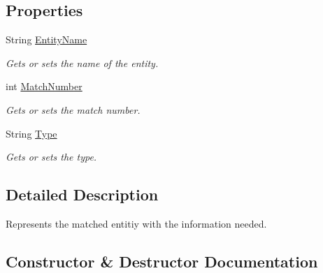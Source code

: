 \subsection*{Properties}
\begin{DoxyCompactItemize}
\item 
String \hyperlink{class_a_t_p_r_n_e_r_1_1_matched_entity_a42a05257a07b5d089ac070b1d9e5461a}{Entity\+Name}
\begin{DoxyCompactList}\small\item\em Gets or sets the name of the entity. \end{DoxyCompactList}\item 
int \hyperlink{class_a_t_p_r_n_e_r_1_1_matched_entity_ad6ca936e2b54158984f7d7d3753d1490}{Match\+Number}
\begin{DoxyCompactList}\small\item\em Gets or sets the match number. \end{DoxyCompactList}\item 
String \hyperlink{class_a_t_p_r_n_e_r_1_1_matched_entity_af7d651ec944931f14c26eedffc4150de}{Type}
\begin{DoxyCompactList}\small\item\em Gets or sets the type. \end{DoxyCompactList}\end{DoxyCompactItemize}


\subsection{Detailed Description}
Represents the matched entitiy with the information needed. 



\subsection{Constructor \& Destructor Documentation}
\hypertarget{class_a_t_p_r_n_e_r_1_1_matched_entity_a5737ccd3008395ca92559e0b1b1f3e73}{}\label{class_a_t_p_r_n_e_r_1_1_matched_entity_a5737ccd3008395ca92559e0b1b1f3e73} 

